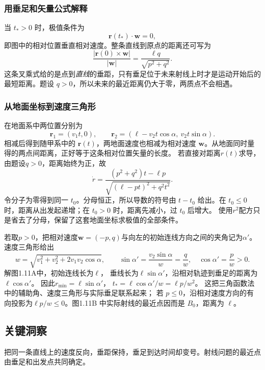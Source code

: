 \documentclass[UTF8,fontset=fandol,a4paper,11pt]{ctexart}
\newcommand{\vect}[1]{\bm{#1}}
\begin{document}
\subsubsection*{用垂足和矢量公式解释}
当 $t_*>0$ 时，极值条件为
\[
\vect r(t_*)\cdot\vect w=0,
\]
即图中的相对位置垂直相对速度。整条直线到原点的距离还可写为
\[
\frac{|\vect r(0)\times\vect w|}{|\vect w|}
=\frac{\ell q}{\sqrt{p^2+q^2}}.
\]
这条叉乘式给的是点到\emph{直线}的垂距，只有垂足位于未来射线上时才是运动开始后的最短距离。题设 $q>0$，所以未来的最近距离仍大于零，两质点不会相遇。
\subsubsection*{从地面坐标到速度三角形}
在地面系中两位置分别为
\[
\vect r_1=(v_1t,0),\qquad
\vect r_2=(\ell-v_2t\cos\alpha,\ v_2t\sin\alpha).
\]
相减后得到随甲系中的 $\vect r(t)$，两地面速度也相减为相对速度 $\vect w$。从地面同时量得的两点间距离，正好等于这条相对位置矢量的长度。
若直接对距离$r(t)$求导，由题设$q>0$，距离始终为正，故
\[
\dot r=\frac{(p^2+q^2)t-\ell p}
{\sqrt{(\ell-pt)^2+q^2t^2}}.
\]
令分子为零得到同一 $t_0$。分母恒正，所以导数的符号由 $t-t_0$ 给出。在 $t_0\leq0$ 时，距离从出发起递增；在 $t_0>0$ 时，距离先减小，过 $t_0$ 后增大。
使用$r^2$配方只是省去了分母，保留了这套地面坐标求极值的全部条件。

若取$p>0$，把相对速度$\vect w=(-p,q)$与向左的初始连线方向之间的夹角记为$\alpha'$。
速度三角形给出
\[
w=\sqrt{v_1^2+v_2^2+2v_1v_2\cos\alpha},\qquad
\sin\alpha'=\frac{v_2\sin\alpha}{w}=\frac q w,\quad
\cos\alpha'=\frac p w>0.
\]
解图1.11A中，初始连线长为$\ell$，
垂线长为$\ell\sin\alpha'$，沿相对轨迹到垂足的距离为$\ell\cos\alpha'$。
因此$r_{\min}=\ell\sin\alpha'$，
$t_*=\ell\cos\alpha'/w=\ell p/w^2$。
这把三角函数法中的辅助角、速度三角形与实际垂足联系起来；
若 $p\leq0$，沿相对速度方向的有向投影为$\ell p/w\leq0$。图1.11B 中实际射线的最近点因而是 $B_0$，距离为 $\ell$。




\subsection*{关键洞察}

把同一条直线上的速度反向，垂距保持，垂足到达时间却变号。射线问题的最近点由垂足和出发点共同确定。


\end{document}
